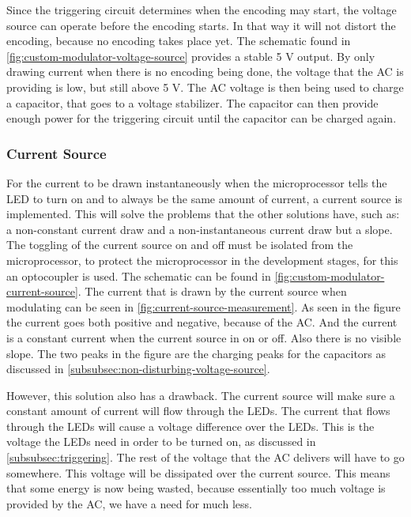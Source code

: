 	Since the triggering circuit determines when the encoding may start, the voltage source can operate before the encoding starts.
	In that way it will not distort the encoding, because no encoding takes place yet.
	The schematic found in \autoref{fig:custom-modulator-voltage-source} provides a stable 5 V output.
	By only drawing current when there is no encoding being done, the voltage that the AC is providing is low, but still above 5 V.
	The AC voltage is then being used to charge a capacitor, that goes to a voltage stabilizer.
	The capacitor can then provide enough power for the triggering circuit until the capacitor can be charged again.





	\subsubsection{Current Source}
	\label{subsubsec:current-source}


	For the current to be drawn instantaneously when the microprocessor tells the LED to turn on and to always be the same amount of current, a current source is implemented. 
	This will solve the problems that the other solutions have, such as: a non-constant current draw and a non-instantaneous current draw but a slope.
	The toggling of the current source on and off must be isolated from the microprocessor, to protect the microprocessor in the development stages, for this an optocoupler is used.
	The schematic can be found in \autoref{fig:custom-modulator-current-source}.
	The current that is drawn by the current source when modulating can be seen in \autoref{fig:current-source-measurement}.
	As seen in the figure the current goes both positive and negative, because of the AC.
	And the current is a constant current when the current source in on or off.
	Also there is no visible slope.
	The two peaks in the figure are the charging peaks for the capacitors as discussed in \autoref{subsubsec:non-disturbing-voltage-source}.


	However, this solution also has a drawback.
	The current source will make sure a constant amount of current will flow through the LEDs.
	The current that flows through the LEDs will cause a voltage difference over the LEDs.
	This is the voltage the LEDs need in order to be turned on, as discussed in \autoref{subsubsec:triggering}.
	The rest of the voltage that the AC delivers will have to go somewhere.
	This voltage will be dissipated over the current source.
	This means that some energy is now being wasted, because essentially too much voltage is provided by the AC, we have a need for much less.

